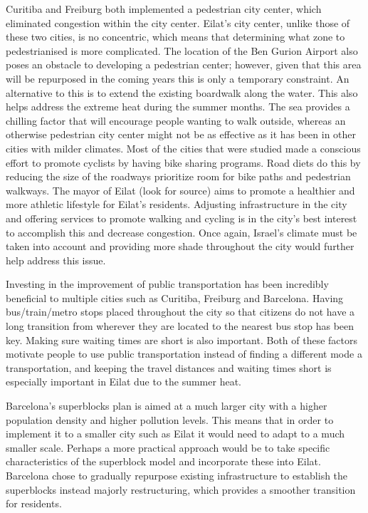 \documentclass[12pt]{article}                         %
\begin{document}
Curitiba and Freiburg both implemented a pedestrian city center, which eliminated congestion within the city center. Eilat’s city center, unlike those of these two cities, is no concentric, which means that determining what zone to pedestrianised is more complicated. The location of the Ben Gurion Airport also poses an obstacle to developing a pedestrian center; however, given that this area will be repurposed in the coming years this is only a temporary constraint. An alternative to this is to extend the existing boardwalk along the water. This also helps address the extreme heat during the summer months. The sea provides a chilling factor that will encourage people wanting to walk outside, whereas an otherwise pedestrian city center might not be as effective as it has been in other cities with milder climates. Most of the cities that were studied made a conscious effort to promote cyclists by having bike sharing programs. Road diets do this by reducing the size of the roadways prioritize room for bike paths and pedestrian walkways. The mayor of Eilat (look for source) aims to promote a healthier and more athletic lifestyle for Eilat’s residents. Adjusting infrastructure in the city and offering services to promote walking and cycling is in the city’s best interest to accomplish this and decrease congestion. Once again, Israel’s climate must be taken into account and providing more shade throughout the city would further help address this issue. 

Investing in the improvement of public transportation has been incredibly beneficial to multiple cities such as Curitiba, Freiburg and Barcelona. Having bus/train/metro stops placed throughout the city so that citizens do not have a long transition from wherever they are located to the nearest bus stop has been key. Making sure waiting times are short is also important. Both of these factors motivate people to use public transportation instead of finding a different mode a transportation, and keeping the travel distances and waiting times short is especially important in Eilat due to the summer heat. 

Barcelona’s superblocks plan is aimed at a much larger city with a higher population density and higher pollution levels. This means that in order to implement it to a smaller city such as Eilat it would need to adapt to a much smaller scale. Perhaps a more practical approach would be to take specific characteristics of the superblock model and incorporate these into Eilat. Barcelona chose to gradually repurpose existing infrastructure to establish the superblocks instead majorly restructuring, which provides a smoother transition for residents.
\end{document}
